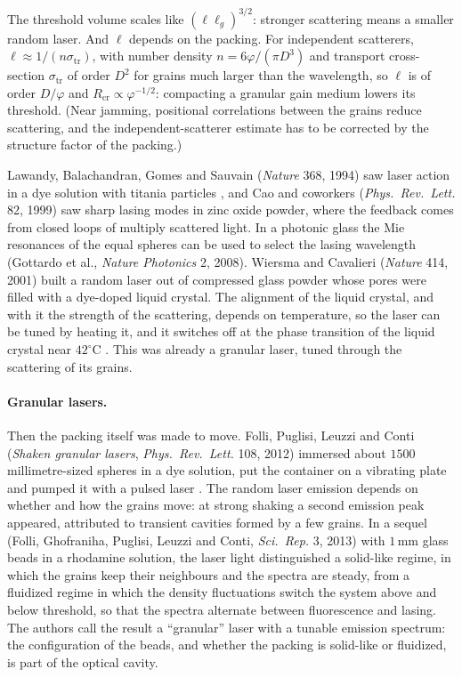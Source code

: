 The threshold volume scales like $(\ell\ell_g)^{3/2}$: stronger scattering means a smaller random laser.
And $\ell$ depends on the packing. For independent scatterers, $\ell\approx1/(n\sigma_{\mathrm{tr}})$, with
number density $n=6\varphi/(\pi D^3)$ and transport cross-section $\sigma_{\mathrm{tr}}$ of order $D^2$ for grains
much larger than the wavelength, so $\ell$ is of order $D/\varphi$ and $R_{\mathrm{cr}}\propto\varphi^{-1/2}$: compacting a
granular gain medium lowers its threshold. (Near jamming, positional correlations between the grains
reduce scattering, and the independent-scatterer estimate has to be corrected by the structure factor of
the packing.)

Lawandy, Balachandran, Gomes and Sauvain (\emph{Nature} 368, 1994) saw laser action in a dye solution
with titania particles , and Cao and coworkers (\emph{Phys.\ Rev.\ Lett.} 82, 1999) saw
sharp lasing modes in zinc oxide powder, where the feedback comes from closed loops of multiply scattered
light. In a photonic glass the Mie resonances of the equal spheres can be used to select the lasing
wavelength (Gottardo et al., \emph{Nature Photonics} 2, 2008). Wiersma and Cavalieri (\emph{Nature} 414, 2001) built a random laser out
of compressed glass powder whose pores were filled with a dye-doped liquid crystal. The alignment of the
liquid crystal, and with it the strength of the scattering, depends on temperature, so the laser can be
tuned by heating it, and it switches off at the phase transition of the liquid crystal near $42^\circ$C
. This was already a granular laser, tuned through the scattering of its grains.

\paragraph{Granular lasers.} Then the packing itself was made to move. Folli, Puglisi, Leuzzi and Conti
(\emph{Shaken granular lasers}, \emph{Phys.\ Rev.\ Lett.} 108, 2012) immersed about $1500$ millimetre-sized
spheres in a dye solution, put the container on a vibrating plate and pumped it with a pulsed laser
. The random laser emission depends on whether and how the grains move: at strong
shaking a second emission peak appeared, attributed to transient cavities formed by a few grains. In
a sequel (Folli, Ghofraniha, Puglisi, Leuzzi and Conti, \emph{Sci.\ Rep.} 3, 2013) with $1$\,mm glass
beads in a rhodamine solution, the laser light distinguished a solid-like regime, in which the grains keep
their neighbours and the spectra are steady, from a fluidized regime in which the density fluctuations
switch the system above and below threshold, so that the spectra alternate between fluorescence and lasing.
The authors call the result a ``granular'' laser with a tunable emission spectrum: the configuration of
the beads, and whether the packing is solid-like or fluidized, is part of the optical cavity.

